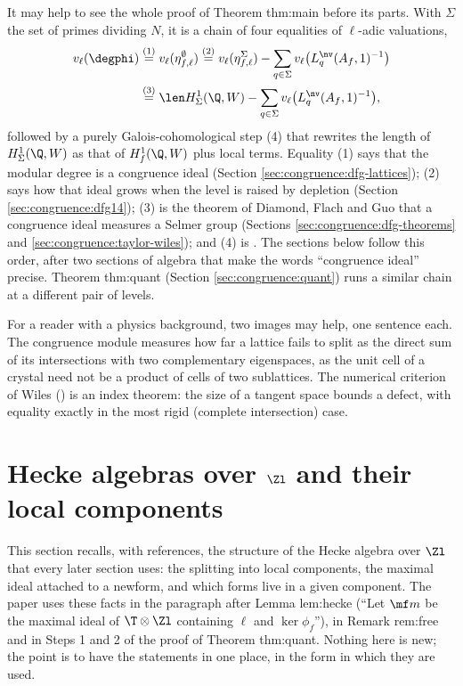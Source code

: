 It may help to see the whole proof of Theorem thm:main before its parts. With $\Sigma$ the set of primes dividing $N$, it is a chain of four equalities of $\ell$-adic valuations,
\begin{align*}
v_\ell(\degphi)&\overset{(1)}=v_\ell(\eta^\emptyset_{f,\ell})\overset{(2)}=v_\ell(\eta^\Sigma_{f,\ell})-\sum_{q\in\Sigma}v_\ell\bigl(L^{\nv}_q(A_f,1)^{-1}\bigr)\\
&\overset{(3)}=\len H^1_\Sigma(\Q,W)-\sum_{q\in\Sigma}v_\ell\bigl(L^{\nv}_q(A_f,1)^{-1}\bigr),
\end{align*}
followed by a purely Galois-cohomological step (4) that rewrites the length of $H^1_\Sigma(\Q,W)$ as that of $H^1_f(\Q,W)$ plus local terms. Equality (1) says that the modular degree is a congruence ideal (Section
\ref{sec:congruence:dfg-lattices}); (2) says how that ideal grows when the level is raised by depletion (Section \ref{sec:congruence:dfg14}); (3) is the theorem of Diamond, Flach and Guo that a congruence ideal
measures a Selmer group (Sections \ref{sec:congruence:dfg-theorems} and \ref{sec:congruence:taylor-wiles}); and (4) is . The sections below follow this order, after two sections of algebra that
make the words ``congruence ideal'' precise. Theorem thm:quant (Section \ref{sec:congruence:quant}) runs a similar chain at a different pair of levels.

For a reader with a physics background, two images may help, one sentence each. The congruence module measures how far a lattice fails to split as the
direct sum of its intersections with two complementary eigenspaces, as the unit cell of a crystal need not be a product of cells of two sublattices. The
numerical criterion of Wiles () is an index theorem: the size of a tangent space bounds a defect, with equality
exactly in the most rigid (complete intersection) case.

\section{Hecke algebras over $\Zl$ and their local components}\label{sec:congruence:hecke-local}

This section recalls, with references, the structure of the Hecke algebra over $\Zl$ that every later section uses: the splitting into local
components, the maximal ideal attached to a newform, and which forms live in a given component. The paper uses these facts in the paragraph after Lemma lem:hecke
(``Let $\mf m$ be the maximal ideal of $\T\otimes\Zl$ containing $\ell$ and $\ker\phi_f$''), in Remark rem:free and in Steps 1 and 2 of the proof of Theorem thm:quant.
Nothing here is new; the point is to have the statements in one place, in the form in which they are used.

